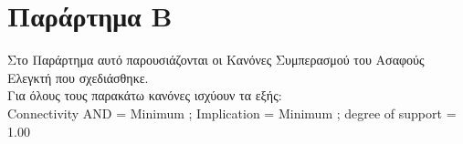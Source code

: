 
\chapter*{Παράρτημα Β}

\label{AppendixB} 
\pagestyle{empty} 	
\pagestyle{fancy}
\fancyhead[RO,LE]{\small\thepage}


{\huge{}}

\noindent Στο Παράρτημα αυτό παρουσιάζονται οι Κανόνες Συμπερασμού του Ασαφούς Ελεγκτή που σχεδιάσθηκε.\\[0.2cm] 
\noindent Για όλους τους παρακάτω κανόνες ισχύουν τα εξής:\\[0.2cm] 
\noindent Connectivity AND = Minimum ;  Implication = Minimum ; degree of support = 1.00


